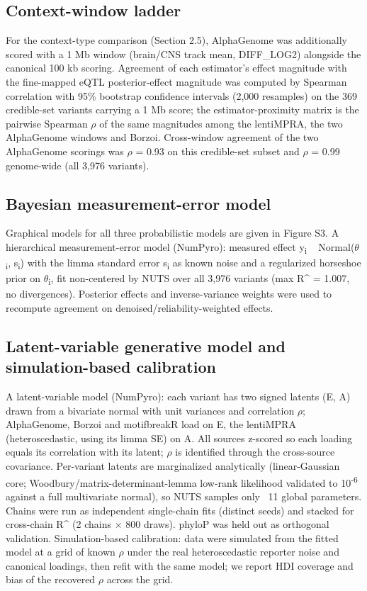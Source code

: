 \documentclass[9pt,twocolumn]{article}
\begin{document}
\subsection{Context-window ladder}

For the context-type comparison (Section 2.5), AlphaGenome was additionally scored with a 1 Mb window (brain/CNS track mean, DIFF_LOG2) alongside the canonical 100 kb scoring. Agreement of each estimator's effect magnitude with the fine-mapped eQTL posterior-effect magnitude was computed by Spearman correlation with 95\% bootstrap confidence intervals (2,000 resamples) on the 369 credible-set variants carrying a 1 Mb score; the estimator-proximity matrix is the pairwise Spearman $\rho$ of the same magnitudes among the lentiMPRA, the two AlphaGenome windows and Borzoi. Cross-window agreement of the two AlphaGenome scorings was $\rho$ = 0.93 on this credible-set subset and $\rho$ = 0.99 genome-wide (all 3,976 variants).


\subsection{Bayesian measurement-error model}

Graphical models for all three probabilistic models are given in Figure S3. A hierarchical measurement-error model (NumPyro): measured effect y\textsubscript{i} ~ Normal($\theta$\textsubscript{i}, s\textsubscript{i}) with the limma standard error s\textsubscript{i} as known noise and a regularized horseshoe prior \cite{r9} on $\theta$\textsubscript{i}, fit non-centered by NUTS over all 3,976 variants (max R\textasciicircum{} = 1.007, no divergences). Posterior effects and inverse-variance weights were used to recompute agreement on denoised/reliability-weighted effects.


\subsection{Latent-variable generative model and simulation-based calibration}

A latent-variable model (NumPyro): each variant has two signed latents (E, A) drawn from a bivariate normal with unit variances and correlation $\rho$; AlphaGenome, Borzoi and motifbreakR load on E, the lentiMPRA (heteroscedastic, using its limma SE) on A. All sources z-scored so each loading equals its correlation with its latent; $\rho$ is identified through the cross-source covariance. Per-variant latents are marginalized analytically (linear-Gaussian core; Woodbury/matrix-determinant-lemma low-rank likelihood validated to 10\textsuperscript{-6} against a full multivariate normal), so NUTS samples only ~11 global parameters. Chains were run as independent single-chain fits (distinct seeds) and stacked for cross-chain R\textasciicircum{} (2 chains $\times$ 800 draws). phyloP was held out as orthogonal validation. Simulation-based calibration: data were simulated from the fitted model at a grid of known $\rho$ under the real heteroscedastic reporter noise and canonical loadings, then refit with the same model; we report HDI coverage and bias of the recovered $\rho$ across the grid.
\end{document}

